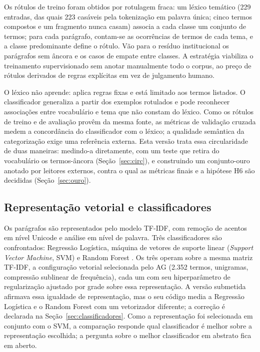 \documentclass[fleqn,10pt]{SelfArx}
\begin{document}
Os rótulos de treino foram obtidos por rotulagem fraca: um léxico temático (229 entradas, das quais 223 casáveis pela tokenização em palavra única; cinco termos compostos e um fragmento nunca casam) associa a cada classe um conjunto de termos; para cada parágrafo, contam-se as ocorrências de termos de cada tema, e a classe predominante define o rótulo. Vão para o resíduo institucional os parágrafos sem âncora e os casos de empate entre classes. A estratégia viabiliza o treinamento supervisionado sem anotar manualmente todo o corpus, ao preço de rótulos derivados de regras explícitas em vez de julgamento humano.

O léxico não aprende: aplica regras fixas e está limitado aos termos listados. O classificador generaliza a partir dos exemplos rotulados e pode reconhecer associações entre vocabulário e tema que não constam do léxico. Como os rótulos de treino e de avaliação provêm da mesma fonte, as métricas de validação cruzada medem a concordância do classificador com o léxico; a qualidade semântica da categorização exige uma referência externa. Esta versão trata essa circularidade de duas maneiras: medindo-a diretamente, com um teste que retira do vocabulário os termos-âncora (Seção~\ref{sec:circ}), e construindo um conjunto-ouro anotado por leitores externos, contra o qual as métricas finais e a hipótese H6 são decididas (Seção~\ref{sec:ouro}).

\subsection{Representação vetorial e classificadores}

Os parágrafos são representados pelo modelo TF-IDF, com remoção de acentos em nível Unicode e análise em nível de palavra. Três classificadores são confrontados: Regressão Logística, máquina de vetores de suporte linear (\textit{Support Vector Machine}, SVM) e Random Forest \cite{breiman2001}. Os três operam sobre a mesma matriz TF-IDF, a configuração vetorial selecionada pelo AG (2.352 termos, unigramas, compressão sublinear de frequência), cada um com seu hiperparâmetro de regularização ajustado por grade sobre essa representação. A versão submetida afirmava essa igualdade de representação, mas o seu código media a Regressão Logística e o Random Forest com um vetorizador diferente; a correção é declarada na Seção~\ref{sec:classificadores}. Como a representação foi selecionada em conjunto com o SVM, a comparação responde qual classificador é melhor sobre a representação escolhida; a pergunta sobre o melhor classificador em abstrato fica em aberto.
\end{document}
